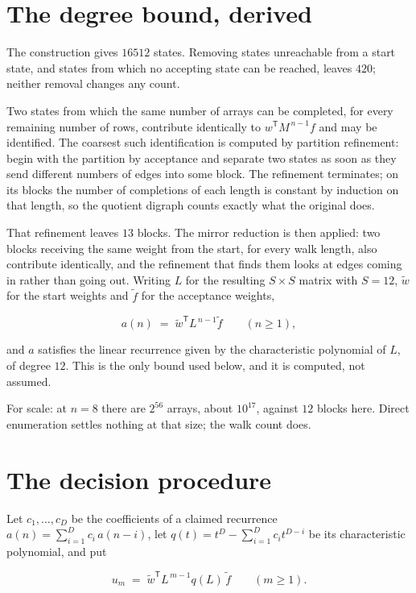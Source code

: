\documentclass[11pt]{article}
\theoremstyle{definition}
\begin{document}
\section{The degree bound, derived}

The construction gives $16512$ states. Removing states unreachable from a start state, and states from which no accepting state can be reached, leaves $420$; neither removal changes any count.

Two states from which the same number of arrays can be completed, for every remaining number of rows, contribute identically to $w^{\mathsf T}M^{\,n-1}f$ and may be identified. The coarsest such identification is computed by partition refinement: begin with the partition by acceptance and separate two states as soon as they send different numbers of edges into some block. The refinement terminates; on its blocks the number of completions of each length is constant by induction on that length, so the quotient digraph counts exactly what the original does.

That refinement leaves $13$ blocks. The mirror reduction is then applied: two blocks receiving the same weight from the start, for every walk length, also contribute identically, and the refinement that finds them looks at edges coming in rather than going out. Writing $L$ for the resulting $S \times S$ matrix with $S = 12$, $\tilde w$ for the start weights and $\tilde f$ for the acceptance weights,

\[a(n) \;=\; \tilde w^{\mathsf T} L^{\,n-1} \tilde f \qquad (n \ge 1),\]

and $a$ satisfies the linear recurrence given by the characteristic polynomial of $L$, of degree $12$. This is the only bound used below, and it is computed, not assumed.

For scale: at $n = 8$ there are $2^{56}$ arrays, about $10^{17}$, against $12$ blocks here. Direct enumeration settles nothing at that size; the walk count does.

\section{The decision procedure}

Let $c_1,\dots,c_D$ be the coefficients of a claimed recurrence $a(n) = \sum_{i=1}^{D} c_i\,a(n-i)$, let $q(t) = t^{D} - \sum_{i=1}^{D} c_i t^{D-i}$ be its characteristic polynomial, and put

\[u_m \;=\; \tilde w^{\mathsf T} L^{\,m-1} q(L)\,\tilde f \qquad (m \ge 1).\]
\end{document}
